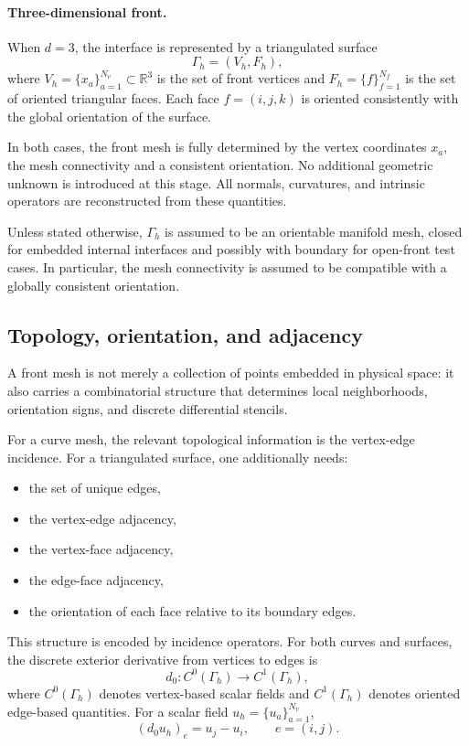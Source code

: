 \documentclass{article}
\begin{document}
\paragraph{Three-dimensional front.}
When $d=3$, the interface is represented by a triangulated surface
\begin{equation}
\Gamma_h = (V_h,F_h),
\end{equation}
where $V_h=\{x_a\}_{a=1}^{N_v}\subset\mathbb{R}^3$ is the set of front vertices
and $F_h=\{f\}_{f=1}^{N_f}$ is the set of oriented triangular faces.
Each face $f=(i,j,k)$ is oriented consistently with the global orientation of the surface.

In both cases, the front mesh is fully determined by the vertex coordinates $x_a$, 
the mesh connectivity and a consistent orientation.
No additional geometric unknown is introduced at this stage.
All normals, curvatures, and intrinsic operators are reconstructed from these quantities.

Unless stated otherwise, $\Gamma_h$ is assumed to be an orientable manifold
mesh, closed for embedded internal interfaces and possibly with boundary for
open-front test cases. In particular, the mesh connectivity is assumed to be
compatible with a globally consistent orientation.

\subsection{Topology, orientation, and adjacency}
\label{subsec:front_topology}

A front mesh is not merely a collection of points embedded in physical space:
it also carries a combinatorial structure that determines local neighborhoods,
orientation signs, and discrete differential stencils.

For a curve mesh, the relevant topological information is the vertex-edge incidence.
For a triangulated surface, one additionally needs:
\begin{itemize}
    \item the set of unique edges,
    \item the vertex-edge adjacency,
    \item the vertex-face adjacency,
    \item the edge-face adjacency,
    \item the orientation of each face relative to its boundary edges.
\end{itemize}

This structure is encoded by incidence operators.
For both curves and surfaces, the discrete exterior derivative from vertices to edges is
\begin{equation}
d_0 : C^0(\Gamma_h) \longrightarrow C^1(\Gamma_h),
\end{equation}
where $C^0(\Gamma_h)$ denotes vertex-based scalar fields and $C^1(\Gamma_h)$ denotes
oriented edge-based quantities. For a scalar field $u_h=\{u_a\}_{a=1}^{N_v}$,
\begin{equation}
(d_0 u_h)_e = u_j-u_i,
\qquad e=(i,j).
\label{eq:d0_def}
\end{equation}
\end{document}
